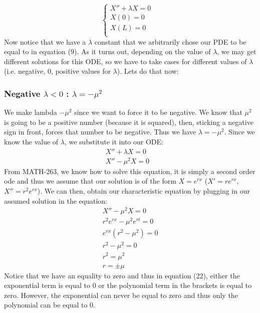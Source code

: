\documentclass[11pt]{article}
\begin{document}
\begin{equation}
	\begin{cases}
    X''+\lambda X=0&\\
    X(0)=0 &\\
    X(L) =0 &\\
  \end{cases}
\end{equation}
Now notice that we have a $\lambda$ constant that we arbitrarily chose our PDE to be equal to in equation (9). As it turns out, depending on the value of $\lambda$, we may get different solutions for this ODE, so we have to take cases for different values of $\lambda$ (i.e. negative, 0, positive values for $\lambda$). Lets do that now:

\subsubsection{Negative $\lambda < 0$ : $\lambda = -\mu^2$}
We make lambda $-\mu^2$ since we want to force it to be negative. We know that $\mu^2$ is going to be a positive number (because it is squared), then, sticking a negative sign in front, forces that number to be negative. Thus we have $\lambda = -\mu^2$. Since we know the value of $\lambda$, we substitute it into our ODE:
\begin{align}
	X''+\lambda X=0&\\
	X'' -\mu^2 X =0 
\end{align}
From MATH-263, we know how to solve this equation, it is simply a second order ode and thus we assume that our solution is of the form $X=e^{rx}$ ($X'=re^{rx}$, $X''=r^2e^{rx}$). We can then, obtain our characteristic equation by plugging in our assumed solution in the equation:
\begin{align}
	X'' -\mu^2 X =0\\
	r^2e^{rx} -\mu^2e^{rt}=0\\
	e^{rx}(r^2-\mu^2) = 0\\
	r^2-\mu^2 =0\\
	r^2 = \mu^2\\
	r = \pm\mu
\end{align}
Notice that we have an equality to zero and thus in equation (22), either the exponential term is equal to 0 or the polynomial term in the brackets is equal to zero. However, the exponential can never be equal to zero and thus only the polynomial can be equal to 0.
\end{document}
